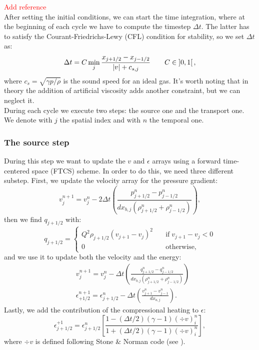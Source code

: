 \documentclass{article}
\begin{document}
\textcolor{red}{Add reference}\\

After setting the initial conditions, we can start the time integration, where at the beginning of each cycle we have to compute the timestep $\Delta t$. The latter has to satisfy the Courant-Friedrichs-Lewy (CFL) condition for stability, so we set $\Delta t$ as:
\begin{equation}\label{timeeq}
	\Delta t=C\min_{j}{\frac{x_{j+1/2}-x_{j-1/2}}{\abs{v}+c_{s,j}}} \qquad C\in \left]0,1\right[,
\end{equation}
where $c_s=\sqrt{\gamma p/\rho}$ is the sound speed for an ideal gas. It's worth noting that in theory the addition of artificial viscosity adds another constraint, but we can neglect it. \\
During each cycle we execute two steps: the source one and the transport one. We denote with $j$ the spatial index and with $n$ the temporal one.
\subsubsection{The source step}
During this step we want to update the $v$ and $\epsilon$ arrays using a forward time-centered space (FTCS) scheme. In order to do this, we need three different substep. First, we update the velocity array for the pressure gradient:
\begin{equation}
	v_{j}^{n+1}=v_{j}^n-2\Delta t\left(\frac{p_{j+1/2}^n-p_{j-1/2}^n}{dx_{b,j}(\rho_{j+1/2}^n+\rho_{j-1/2}^n)}\right),
\end{equation}
then we find $q_{j+1/2}$ with:
\begin{equation}
	q_{j+1/2}=
	\begin{cases}
		Q^{2}\rho_{j+1/2}(v_{j+1}-v_j)^2 \quad &\text{if} \; v_{j+1}-v_j<0\\
		0 \quad &\text{otherwise},
	\end{cases}
\end{equation}
and we use it to update both the velocity and the energy:
\begin{align}
	&v_j^{n+1}=v_j^n-\Delta t\left(\frac{q_{j+1/2}^n-q_{j-1/2}^n}{dx_{b,j}(\rho_{j+1/2}^n+\rho_{j-1/2}^n)}\right)\\
	&\epsilon_{+1/2}^{n+1}=\epsilon_{j+1/2}^n-\Delta t\left(\frac{v_{j+1}^n-v_{j-1}^n}{dx_{a,j}}\right).
\end{align}
Lastly, we add the contribution of the compressional heating to $\epsilon$:
\begin{equation}
	\epsilon^{+1}_{j+1/2}=\epsilon^n_{j+1/2}\left[\frac{1-(\Delta t/2)(\gamma -1)(\div{v})_i^n}{1+(\Delta t/2)(\gamma -1)(\div{v})_i^n}\right],
\end{equation}
where $\div{v}$ is defined following Stone \& Norman code (see \cite{stone}).
\end{document}
